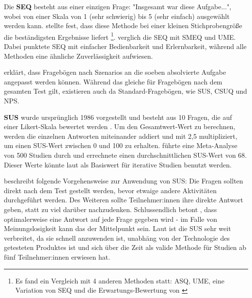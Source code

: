 \vspace{\baselineskip}

Die \textbf{\ac{SEQ}} besteht aus einer einzigen Frage: "Insgesamt war diese Aufgabe...", wobei von einer Skala von 1 (sehr schwierig) bis 5 (sehr einfach) ausgewählt werden kann. \textcite{tedescoComparisonMethods2006} stellte fest, dass diese Methode bei einer kleinen Stichprobengröße die beständigsten Ergebnisse liefert \footnote{Es fand ein Vergleich mit 4 anderen Methoden statt: \ac{ASQ}, \ac{UME}, eine Variation von \ac{SEQ} und die Erwartungs-Bewertung von \textcite{albertThisWhat2003}}. \textcite{sauroComparisonThree2009} verglich die \ac{SEQ} mit \ac{SMEQ} und \ac{UME}. Dabei punktete \ac{SEQ} mit einfacher Bedienbarkeit und Erlernbarkeit, während alle Methoden eine ähnliche Zuverlässigkeit aufwiesen.

\textcite{barnumUsabilityTesting2021} erklärt, dass Fragebögen nach Szenarios an die soeben absolvierte Aufgabe angepasst werden können. Während das gleiche für Fragebögen nach dem gesamten Test gilt, existieren auch da Standard-Fragebögen, wie \ac{SUS}, \ac{CSUQ} und \ac{NPS}.

\vspace{\baselineskip}

\textbf{\ac{SUS}} wurde ursprünglich 1986 vorgestellt und besteht aus 10 Fragen, die auf einer Likert-Skala bewertet werden \parencite{brookeSUSQuick1996}. Um den Gesamtwert-Wert zu berechnen, werden die einzelnen Antworten miteinander addiert und mit 2,5 multipliziert, um einen \ac{SUS}-Wert zwischen 0 und 100 zu erhalten. \textcite{sauroMeasuringUsability2011} führte eine Meta-Analyse von 500 Studien durch und errechnete einen durchschnittlichen \ac{SUS}-Wert von 68. Dieser Werte könnte laut \textcite{barnumUsabilityTesting2021} als Basiswert für iterative Studien benutzt werden.

\textcite{brookeSUSQuick1996} beschreibt folgende Vorgehensweise zur Anwendung von \ac{SUS}: Die Fragen sollten direkt nach dem Test gestellt werden, bevor etwaige andere Aktivitäten durchgeführt werden. Des Weiteren sollte Teilnehmer:innen ihre direkte Antwort geben, statt zu viel darüber nachzudenken. Schlussendlich betont \textcite{brookeSUSQuick1996}, dass optimalerweise eine Antwort auf jede Frage gegeben wird - im Falle von Meinungslosigkeit kann das der Mittelpunkt sein. Laut \textcite{barnumUsabilityTesting2021} ist die \ac{SUS} sehr weit verbreitet, da sie schnell anzuwenden ist, unabhäng von der Technologie des getesteten Produktes ist und sich über die Zeit als valide Methode für Studien ab fünf Teilnehmer:innen erwiesen hat.

